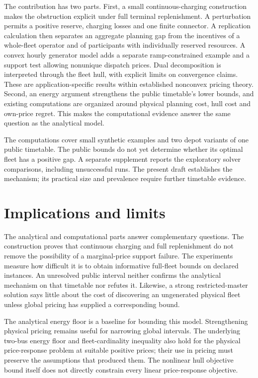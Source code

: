 \documentclass[11pt]{article}
\let\originalsection\section
\renewcommand{\section}{\FloatBarrier\originalsection}
\begin{document}
The contribution has two parts. First, a small continuous-charging construction makes the obstruction explicit under full terminal replenishment. A perturbation permits a positive reserve, charging losses and one finite connector. A replication calculation then separates an aggregate planning gap from the incentives of a whole-fleet operator and of participants with individually reserved resources. A convex hourly generator model adds a separate ramp-constrained example and a support test allowing nonunique dispatch prices. Dual decomposition is interpreted through the fleet hull, with explicit limits on convergence claims. These are application-specific results within established nonconvex pricing theory. Second, an energy argument strengthens the public timetable's lower bounds, and existing computations are organized around physical planning cost, hull cost and own-price regret. This makes the computational evidence answer the same question as the analytical model.

The computations cover small synthetic examples and two depot variants of one public timetable. The public bounds do not yet determine whether its optimal fleet has a positive gap. A separate supplement reports the exploratory solver comparisons, including unsuccessful runs. The present draft establishes the mechanism; its practical size and prevalence require further timetable evidence.








\section{Implications and limits}
The analytical and computational parts answer complementary questions. The construction proves that continuous charging and full replenishment do not remove the possibility of a marginal-price support failure. The experiments measure how difficult it is to obtain informative full-fleet bounds on declared instances. An unresolved public interval neither confirms the analytical mechanism on that timetable nor refutes it. Likewise, a strong restricted-master solution says little about the cost of discovering an ungenerated physical fleet unless global pricing has supplied a corresponding bound.

The analytical energy floor is a baseline for bounding this model. Strengthening physical pricing remains useful for narrowing global intervals. The underlying two-bus energy floor and fleet-cardinality inequality also hold for the physical price-response problem at suitable positive prices; their use in pricing must preserve the assumptions that produced them. The nonlinear hull objective bound itself does not directly constrain every linear price-response objective.
\end{document}
